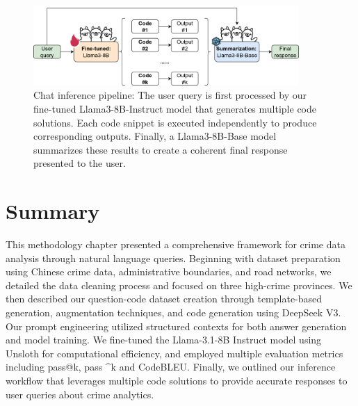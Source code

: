 \begin{figure}[H]
  \centering
  \includegraphics[width=0.9\textwidth]{images/inference_pipeline.drawio.png}
  \caption{Chat inference pipeline: The user query is first processed by our fine-tuned Llama3-8B-Instruct model that generates multiple code solutions. Each code snippet is executed independently to produce corresponding outputs. Finally, a Llama3-8B-Base model summarizes these results to create a coherent final response presented to the user.}
  \label{fig:inference_pipeline}
\end{figure}

\section{Summary}

This methodology chapter presented a comprehensive framework for crime data analysis through natural language queries. Beginning with dataset preparation using Chinese crime data, administrative boundaries, and road networks, we detailed the data cleaning process and focused on three high-crime provinces. We then described our question-code dataset creation through template-based generation, augmentation techniques, and code generation using DeepSeek V3. Our prompt engineering utilized structured contexts for both answer generation and model training. We fine-tuned the Llama-3.1-8B Instruct model using Unsloth for computational efficiency, and employed multiple evaluation metrics including pass@k, pass \textasciicircum k and CodeBLEU. Finally, we outlined our inference workflow that leverages multiple code solutions to provide accurate responses to user queries about crime analytics.
